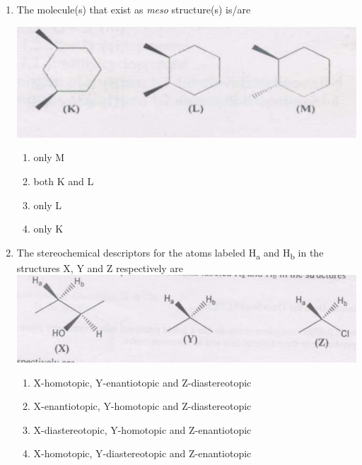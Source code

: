 \documentclass[journal,12pt,onecolumn]{IEEEtran}
\theoremstyle{remark}
\begin{document}
\begin{enumerate}
\begin{multicols}{2}
\begin{enumerate}
     \item   disrotatory, disrotatory, disrotatory
     \item   conrotatory, conrotatory, conrotatory
     \item   disrotatory, disrotatory, conrotatory
     \item   disrotatory, conrotatory, disrotatory
\end{enumerate}
\end{multicols}

  


\item  The molecule(s) that exist as \textit{meso} structure(s) is/are \hfill{}

\includegraphics[scale=1]{figs/image9.png}



\begin{multicols}{2}
\begin{enumerate}
   \item   only M
   \item   both K and L
   \item   only L
   \item   only K
\end{enumerate}
\end{multicols}

  

\item  The stereochemical descriptors for the atoms labeled H\textsubscript{a} and H\textsubscript{b} in the structures X, Y and Z respectively are \hfill{}
\includegraphics[scale=1]{figs/image10.png}
\begin{multicols}{2}
\begin{enumerate}[label=(\Alph*)]
\item X-homotopic, Y-enantiotopic and Z-diastereotopic
\item X-enantiotopic, Y-homotopic and Z-diastereotopic
\item X-diastereotopic, Y-homotopic and Z-enantiotopic
\item X-homotopic, Y-diastereotopic and Z-enantiotopic
\end{enumerate}
\end{multicols}
  


\end{enumerate}
\end{document}
